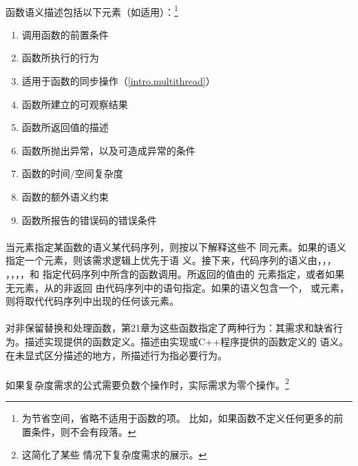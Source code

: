\paragraph{}
函数语义描述包括以下元素（如适用）：\footnote{为节省空间，省略不适用于函数的项。
比如，如果函数不定义任何更多的前置条件，则不会有段落。}
\begin{enumerate}
  \item{调用函数的前置条件}
  \item{函数所执行的行为}
  \item{适用于函数的同步操作（\ref{intro.multithread}）}
  \item{函数所建立的可观察结果}
  \item{函数所返回值的描述}
  \item{函数所抛出异常，以及可造成异常的条件}
  \item{函数的时间/空间复杂度}
  \item{函数的额外语义约束}
  \item{函数所报告的错误码的错误条件}
\end{enumerate}

\paragraph{}
当元素指定某函数的语义某代码序列，则按以下解释这些不
同元素。如果的语义指定一个元素，则该需求逻辑上优先于语
义。接下来，代码序列的语义由，，，
，，，，和
指定代码序列中所含的函数调用。所返回的值由的
元素指定，或者如果无元素，从的非返回
由代码序列中的语句指定。如果的语义包含一个，
或元素，则将取代代码序列中出现的任何该元素。

\paragraph{}
对非保留替换和处理函数，第21章为这些函数指定了两种行为：其需求和缺省行为。描述实现提供的函数定义。描述由实现或C++程序提供的函数定义的
语义。在未显式区分描述的地方，所描述行为指必要行为。

\paragraph{}
如果复杂度需求的公式需要负数个操作时，实际需求为零个操作。\footnote{这简化了某些
情况下复杂度需求的展示。}

